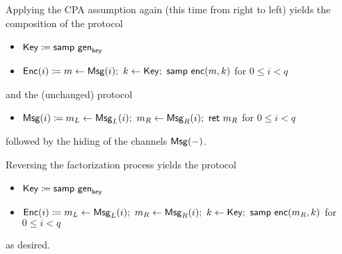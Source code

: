 Applying the CPA assumption again (this time from right to left) yields the composition of the protocol
\begin{itemize}
\item $\mathsf{Key} \coloneqq \mathsf{samp} \ \mathsf{gen}_{\mathsf{key}}$
\item $\mathsf{Enc}(i) \coloneqq m \leftarrow \mathsf{Msg}(i); \ k \leftarrow \mathsf{Key}; \ \mathsf{samp} \ \mathsf{enc}(m, k)$ for $0 \leq i < q$
\end{itemize}
and the (unchanged) protocol
\begin{itemize}
\item $\mathsf{Msg}(i) \coloneqq m_L \leftarrow \mathsf{Msg}_L(i); \ m_R \leftarrow \mathsf{Msg}_R(i); \ \mathsf{ret} \ m_R$ for $0 \leq i < q$
\end{itemize}
followed by the hiding of the channels $\mathsf{Msg}(-)$.

Reversing the factorization process yields the protocol
\begin{itemize}
\item $\mathsf{Key} \coloneqq \mathsf{samp} \ \mathsf{gen}_{\mathsf{key}}$
\item $\Enc(i) \coloneqq m_L \leftarrow \MsgL(i); \ m_R \leftarrow \MsgR(i); \ k \leftarrow \Key; \ \samp{\enc(m_R, k)}$ for $0 \leq i < q$
\end{itemize}
as desired.